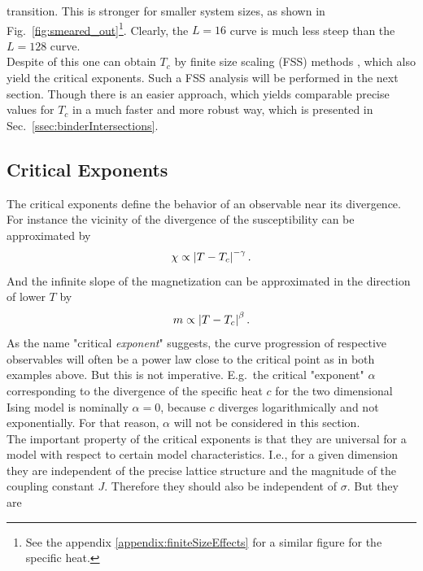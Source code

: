     transition. This is stronger for smaller system sizes, as shown
    in Fig.\ \ref{fig:smeared_out}\footnote{See the appendix \ref{appendix:finiteSizeEffects} for a similar figure for the specific heat.}.
    Clearly, the \(L=16\) curve is much less steep than the \(L=128\) curve.\\
    Despite of this one can obtain \(T_c\) by finite size scaling (FSS)
    methods \cite[p. 232ff]{NewmanBarkema1999}, which also yield the critical
    exponents. Such a FSS analysis will be performed in the next section.
    Though there is an easier approach, which yields comparable precise
    values for \(T_{c}\) in a much faster and more robust way, which is
    presented in Sec.\ \ref{ssec:binderIntersections}.

\subsection{Critical Exponents}
\label{ssec:critExp}
    The critical exponents define the behavior of an observable near its
    divergence. For instance the vicinity of the divergence of the susceptibility
    can be approximated by
    \begin{equation}
        \chi \propto \left\vert T-T_{c}\right\vert^{-\gamma}.
        \label{eq:critExp:gamma}
    \end{equation}
    And the infinite slope of the magnetization can be approximated in
    the direction of lower \(T\) by
    \begin{equation}
        m \propto \left\vert T-T_{c}\right\vert^{\beta}.
        \label{eq:critExp:beta}
    \end{equation}
    As the name "critical \emph{exponent}" suggests, the curve progression
    of respective observables will often be a power law close to the critical
    point as in both examples above. But this is not imperative.
    E.g.\ the critical "exponent" \(\alpha\) corresponding to the divergence of
    the specific heat \(c\) for the two dimensional Ising model is nominally \(\alpha = 0\),
    because \(c\) diverges logarithmically and not exponentially.
    For that reason, \(\alpha\) will not be considered in this section.\\
    The important property of the critical exponents is that they are
    universal for a model with respect to certain model characteristics.
    I.e., for a given dimension they are independent of the precise lattice
    structure and the magnitude of the coupling constant \(J\).
    Therefore they should also be independent of \(\sigma\). But they are
